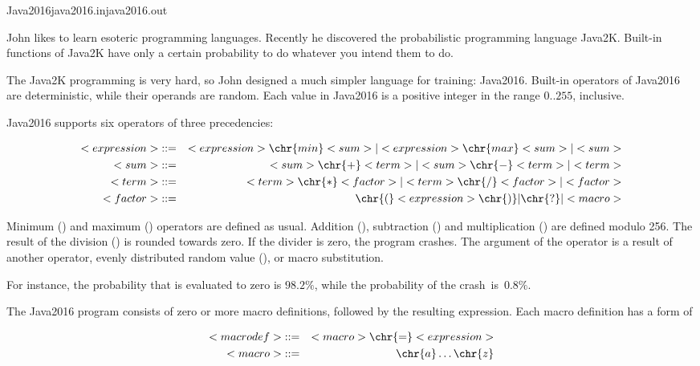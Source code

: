 \begin{problem}{Java2016}{java2016.in}{java2016.out}{\timeLimit}


John likes to learn esoteric programming languages.
Recently he discovered the probabilistic programming language Java2K.
Built-in functions of Java2K have only a certain probability 
to do whatever you intend them to do.

The Java2K programming is very hard, so John designed a much simpler
language for training: Java2016. Built-in operators of Java2016 are
deterministic, while their operands are random. 
Each value in Java2016 is a positive integer in the range $0..255$, inclusive.

Java2016 supports six operators of three precedencies:
\vspace{-0.8ex}\begin{bnf}\begin{eqnarray*}
<expression>&::=& <expression> \chr{min} <sum> | <expression> \chr{max} <sum> | <sum>\\
<sum>       &::=& <sum> \chr{+} <term> | <sum> \chr{-} <term> | <term> \\
<term>      &::=& <term> \chr{*} <factor> | <term> \chr{/} <factor> | <factor> \\
<factor>    &::=& \chr{(} <expression> \chr{)} | \chr{?} | <macro>
\end{eqnarray*}\end{bnf}\vspace{-2em}

Minimum () and maximum () operators are defined as usual.
Addition (\chr{+}), subtraction (\chr{-}) and multiplication (\chr{*}) are
defined modulo 256.
The result of the division (\chr{/}) is rounded towards zero.
If the divider is zero, the program crashes.
The argument of the operator is a result of another operator,
evenly distributed random value (), or macro substitution.

For instance, the probability that  is evaluated to zero is $98.2\%$,
while the probability of the crash~is~$0.8\%$.

The Java2016 program consists of zero or more macro definitions, followed
by the resulting expression. Each macro definition has a form of 
\vspace{-0.8ex}\begin{bnf}\begin{eqnarray*}
<macrodef>  &::=& <macro> \chr{=} <expression> \\
<macro>     &::=& \chr{a} \dots \chr{z}
\end{eqnarray*}\end{bnf}\vspace{-2em}


\end{problem}

